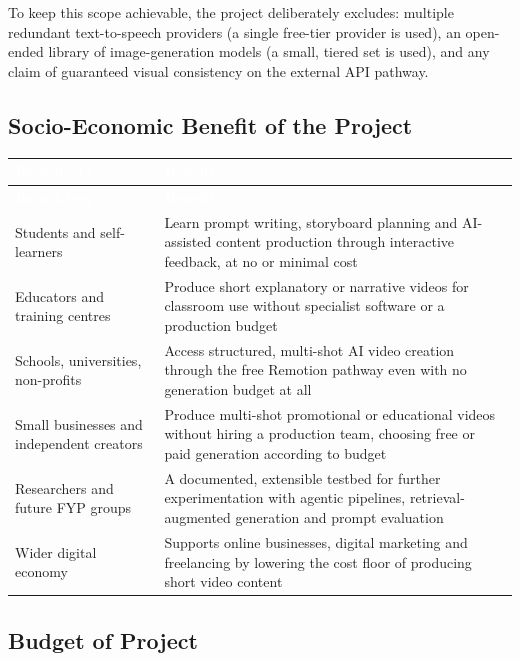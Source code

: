 \documentclass[11pt,a4paper]{article}
\newcommand{\tblhead}[1]{\cellcolor{headerblue}\textcolor{white}{\textbf{#1}}}
\begin{document}
To keep this scope achievable, the project deliberately excludes: multiple redundant text-to-speech providers (a single free-tier provider is used), an open-ended library of image-generation models (a small, tiered set is used), and any claim of guaranteed visual consistency on the external API pathway.

\subsection{Socio-Economic Benefit of the Project}

\begin{center}
\begin{longtable}{|p{4.3cm}|p{9.7cm}|}
\hline
\tblhead{Beneficiary} & \tblhead{Benefit} \\
\hline
\endfirsthead
\hline
\tblhead{Beneficiary} & \tblhead{Benefit} \\
\hline
\endhead
Students and self-learners & Learn prompt writing, storyboard planning and AI-assisted content production through interactive feedback, at no or minimal cost \\
\hline
Educators and training centres & Produce short explanatory or narrative videos for classroom use without specialist software or a production budget \\
\hline
Schools, universities, non-profits & Access structured, multi-shot AI video creation through the free Remotion pathway even with no generation budget at all \\
\hline
Small businesses and independent creators & Produce multi-shot promotional or educational videos without hiring a production team, choosing free or paid generation according to budget \\
\hline
Researchers and future FYP groups & A documented, extensible testbed for further experimentation with agentic pipelines, retrieval-augmented generation and prompt evaluation \\
\hline
Wider digital economy & Supports online businesses, digital marketing and freelancing by lowering the cost floor of producing short video content \\
\hline
\end{longtable}
\end{center}

\subsection{Budget of Project}
\end{document}
